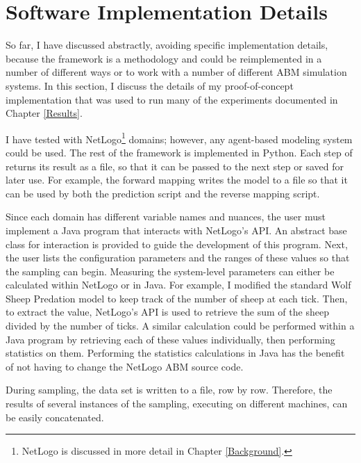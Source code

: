 \section{Software Implementation Details}
So far, I have discussed \fw abstractly, avoiding specific implementation details, because the framework is a methodology and could be reimplemented in a number of different ways or to work with a number of different ABM simulation systems.
In this section, I discuss the details of my proof-of-concept implementation that was used to run many of the experiments documented in Chapter \ref{Results}.

I have tested \fw with NetLogo\footnote{NetLogo is discussed in more detail in Chapter \ref{Background}.} domains; however, any agent-based modeling system could be used.
The rest of the framework is implemented in Python.
Each step of \fw returns its result as a file, so that it can be passed to the next step or saved for later use.
For example, the forward mapping writes the model to a file so that it can be used by both the prediction script and the reverse mapping script.

Since each domain has different variable names and nuances, the user must implement a Java program that interacts with NetLogo's API.
An abstract base class for interaction is provided to guide the development of this program.
Next, the user lists the configuration parameters and the ranges of these values so that the sampling can begin.
Measuring the system-level parameters can either be calculated within NetLogo or in Java.
For example, I modified the standard Wolf Sheep Predation model to keep track of the number of sheep at each tick.
Then, to extract the value, NetLogo's API is used to retrieve the sum of the sheep divided by the number of ticks.
A similar calculation could be performed within a Java program by retrieving each of these values individually, then performing statistics on them.
Performing the statistics calculations in Java has the benefit of not having to change the NetLogo ABM source code.


During sampling, the data set is written to a file, row by row.
Therefore, the results of several instances of the sampling, executing on different machines, can be easily concatenated.


